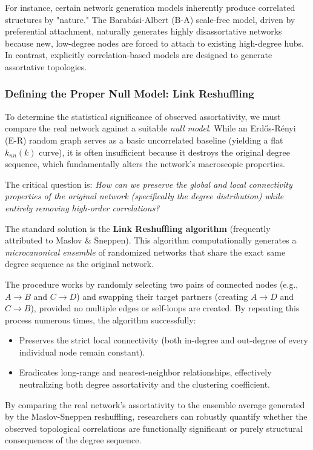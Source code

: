 For instance, certain network generation models inherently produce correlated structures by "nature." The Barabási-Albert (B-A) scale-free model, driven by preferential attachment, naturally generates highly disassortative networks because new, low-degree nodes are forced to attach to existing high-degree hubs. In contrast, explicitly correlation-based models are designed to generate assortative topologies.

\subsubsection{Defining the Proper Null Model: Link Reshuffling}

To determine the statistical significance of observed assortativity, we must compare the real network against a suitable \textit{null model}. While an Erdős-Rényi (E-R) random graph serves as a basic uncorrelated baseline (yielding a flat $k_{nn}(k)$ curve), it is often insufficient because it destroys the original degree sequence, which fundamentally alters the network's macroscopic properties.

The critical question is: \textit{How can we preserve the global and local connectivity properties of the original network (specifically the degree distribution) while entirely removing high-order correlations?}

The standard solution is the \textbf{Link Reshuffling algorithm} (frequently attributed to Maslov \& Sneppen). This algorithm computationally generates a \textit{microcanonical ensemble} of randomized networks that share the exact same degree sequence as the original network.

The procedure works by randomly selecting two pairs of connected nodes (e.g., $A \rightarrow B$ and $C \rightarrow D$) and swapping their target partners (creating $A \rightarrow D$ and $C \rightarrow B$), provided no multiple edges or self-loops are created. By repeating this process numerous times, the algorithm successfully:
\begin{itemize}
    \item Preserves the strict local connectivity (both in-degree and out-degree of every individual node remain constant).
    \item Eradicates long-range and nearest-neighbor relationships, effectively neutralizing both degree assortativity and the clustering coefficient.
\end{itemize}
By comparing the real network's assortativity to the ensemble average generated by the Maslov-Sneppen reshuffling, researchers can robustly quantify whether the observed topological correlations are functionally significant or purely structural consequences of the degree sequence.

